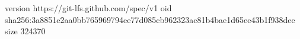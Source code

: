 version https://git-lfs.github.com/spec/v1
oid sha256:3a8851e2aa0bb765969794ee77d085cb962323ac81b4bae1d65ee43b1f938dee
size 324370
